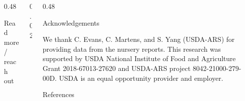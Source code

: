\documentclass[final]{beamer}
\newlength{\twocolwid}
\begin{document}
\begin{frame}[t]
\begin{columns}[t]
\begin{column}{\twocolwid}
\begin{columns}[t,totalwidth=\twocolwid]
\begin{column}{0.48\twocolwid}
\begin{alertblock}{Read more / reach out}
\end{alertblock}


\end{column}


\begin{column}{0.02\twocolwid}
\end{column}





\begin{column}{0.48\twocolwid}






\begin{block}{\large{Acknowledgements}}

\begin{footnotesize}

We thank C. Evans, C. Martens, and S. Yang (USDA-ARS) for providing data from the nursery reports. This research was supported by USDA National Institute of Food and Agriculture Grant 2018-67013-27620 and USDA-ARS project 8042-21000-279-00D. USDA is an equal opportunity provider and employer.

\end{footnotesize}

\end{block}



\begin{block}{\large{References}}



\begin{footnotesize}


\end{footnotesize}
\end{block}
\end{column}
\end{columns}
\end{column}
\end{columns}
\end{frame}
\end{document}
